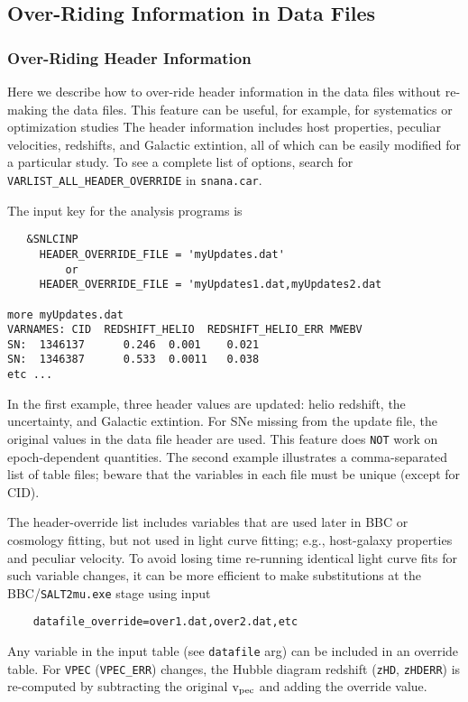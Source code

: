 \documentclass[12pt]{article}
\newcommand{\vpec}{{\rm v}_{\rm pec}}
\begin{document}
\clearpage
\subsection{Over-Riding Information in Data Files}
\label{subsec:data_override}


\subsubsection{Over-Riding Header Information}
\label{sss:header_override}

Here we describe how to over-ride header information in the
data files without re-making the data files. This feature
can be useful, for example, for systematics or optimization studies
The header information includes host properties, peculiar
velocities, redshifts, and Galactic extintion, all of which
can be easily modified for a particular study. To see a complete
list of options, search for 
{\tt VARLIST\_ALL\_HEADER\_OVERRIDE} in {\tt snana.car}.

The input key for the analysis programs is
\begin{verbatim}
   &SNLCINP
     HEADER_OVERRIDE_FILE = 'myUpdates.dat'
         or
     HEADER_OVERRIDE_FILE = 'myUpdates1.dat,myUpdates2.dat

more myUpdates.dat
VARNAMES: CID  REDSHIFT_HELIO  REDSHIFT_HELIO_ERR MWEBV
SN:  1346137      0.246  0.001    0.021
SN:  1346387      0.533  0.0011   0.038
etc ...
\end{verbatim}
%

In the first example, three header values are updated:
helio redshift, the uncertainty, and Galactic extintion.
For SNe missing from the update file, the original values in the 
data file header are used. This feature does {\tt NOT} work
on epoch-dependent quantities.
The second example illustrates a comma-separated list of table files;
beware that the variables in each file must be unique (except for CID).

The header-override list includes variables that are used later in 
BBC or cosmology fitting, but not used in light curve fitting;
e.g., host-galaxy properties and peculiar velocity. To avoid 
losing time re-running identical light curve fits for such variable changes,
it can be more efficient to make substitutions at the 
BBC/{\tt SALT2mu.exe} stage using input 
\vspace{-0.4cm}
\begin{verbatim}
    datafile_override=over1.dat,over2.dat,etc
\end{verbatim}
Any variable in the input table (see {\tt datafile} arg) can be
included in an override table.
For {\tt VPEC} ({\tt VPEC\_ERR}) changes, the Hubble diagram 
redshift ({\tt zHD}, {\tt zHDERR}) is re-computed by subtracting
the original $\vpec$ and adding the override value.
\end{document}
